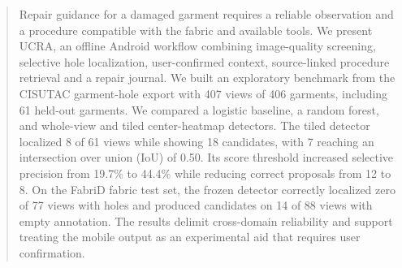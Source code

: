 \begin{abstract}
Repair guidance for a damaged garment requires a reliable observation and a procedure compatible with the fabric and available tools. We present UCRA, an offline Android workflow combining image-quality screening, selective hole localization, user-confirmed context, source-linked procedure retrieval and a repair journal. We built an exploratory benchmark from the CISUTAC garment-hole export with 407 views of 406 garments, including 61 held-out garments. We compared a logistic baseline, a random forest, and whole-view and tiled center-heatmap detectors. The tiled detector localized 8 of 61 views while showing 18 candidates, with 7 reaching an intersection over union (IoU) of 0.50. Its score threshold increased selective precision from 19.7\% to 44.4\% while reducing correct proposals from 12 to 8. On the FabriD fabric test set, the frozen detector correctly localized zero of 77 views with holes and produced candidates on 14 of 88 views with empty annotation. The results delimit cross-domain reliability and support treating the mobile output as an experimental aid that requires user confirmation.
\end{abstract}
